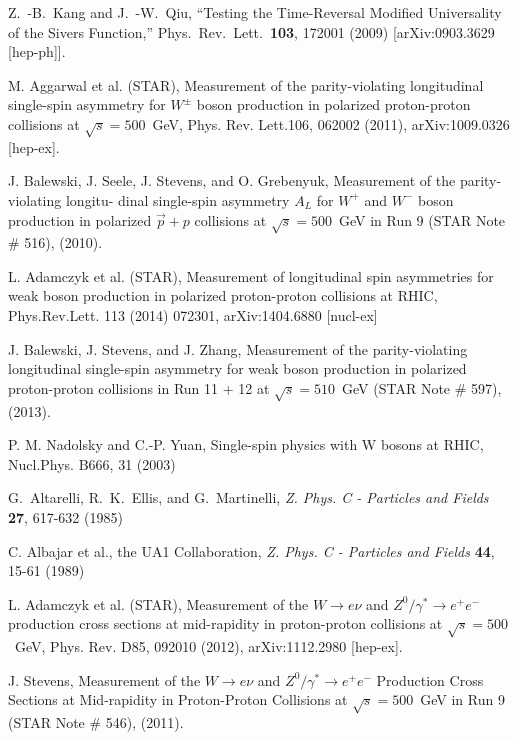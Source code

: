 \documentclass[12pt]{article}
\begin{document}
\begin{thebibliography}{9}


  Z.~-B.~Kang and J.~-W.~Qiu,
  ``Testing the Time-Reversal Modified Universality of the Sivers Function,''
  Phys.\ Rev.\ Lett.\  {\bf 103}, 172001 (2009)
  [arXiv:0903.3629 [hep-ph]].

M. Aggarwal et al. (STAR), Measurement of the parity-violating longitudinal single-spin asymmetry
for $W^{\pm}$ boson production in polarized proton-proton collisions at $\sqrt{s} = 500$~GeV, 
Phys. Rev. Lett.106, 062002 (2011), 
arXiv:1009.0326 [hep-ex].

J. Balewski, J. Seele, J. Stevens, and O. Grebenyuk, Measurement of the parity-violating longitu-
dinal single-spin asymmetry $A_{L}$ for $W^{+}$ and $W^{-}$ boson production in polarized $\vec{p} + p$ collisions at
$\sqrt{s}=500$~GeV in Run 9 (STAR Note \# 516), (2010).

L. Adamczyk et al. (STAR), Measurement of longitudinal spin asymmetries for weak boson production in polarized proton-proton collisions at RHIC, 
Phys.Rev.Lett. 113 (2014) 072301, 
arXiv:1404.6880 [nucl-ex]

J. Balewski, J. Stevens, and J. Zhang, Measurement of the parity-violating longitudinal single-spin
asymmetry for weak boson production in polarized proton-proton collisions in Run 11 + 12 at
$\sqrt{s} = 510$~GeV (STAR Note \# 597), (2013).

P. M. Nadolsky and C.-P. Yuan, Single-spin physics with W bosons at RHIC, Nucl.Phys. B666, 31 (2003)

G.~Altarelli, R.~K.~Ellis, and G.~Martinelli, {\it Z. Phys. C - Particles and Fields} {\bf 27}, 617-632 (1985)

C. Albajar et al., the UA1 Collaboration, {\it Z. Phys. C - Particles and Fields} {\bf 44}, 15-61 (1989)

L. Adamczyk et al. (STAR), Measurement of the $W\rightarrow e\nu$ and $Z^{0}/\gamma^{*}\rightarrow e^{+}e^{-}$ 
production cross sections at mid-rapidity in proton-proton collisions at
$\sqrt{s} = 500$~GeV, 
Phys. Rev. D85, 092010 (2012), 
arXiv:1112.2980 [hep-ex].

J. Stevens, Measurement of the $W\rightarrow e\nu$ and $Z^{0}/\gamma^{*}\rightarrow e^{+}e^{-}$  
Production Cross Sections at Mid-rapidity in Proton-Proton Collisions at
$\sqrt{s}=500$~GeV in Run 9 (STAR Note \# 546), (2011).


\end{thebibliography}
\end{document}
